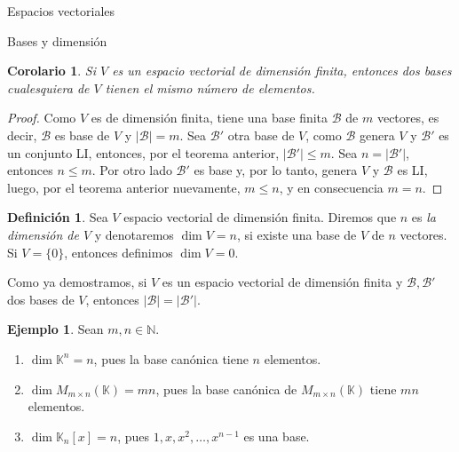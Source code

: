 \documentclass[a4paper,12pt,twoside,spanish,reqno]{amsbook}
\newtheorem{corolario}[teorema]{Corolario}
\theoremstyle{definition}
\newtheorem{definicion}{Definici\'on}[section]
\newtheorem{ejemplo}{Ejemplo}[section]
\theoremstyle{remark}
\newcommand{\K}{\mathbb K}
\begin{document}
\begin{chapter}{Espacios vectoriales}
\begin{section}{Bases y dimensión}
\begin{corolario}
	Si $V$ es un espacio vectorial de dimensión finita, entonces dos bases cualesquiera de $V$ tienen el mismo número de elementos.
\end{corolario}
\begin{proof}
		Como $V$ es de dimensión finita, tiene una base finita $\mathcal B$  de $m$ vectores, es decir,  $\mathcal B$ es base de $V$ y  $|\mathcal B| = m.$
		Sea $\mathcal B'$  otra base de $V$, como $\mathcal B$  genera $V$ y  $\mathcal B'$ es  un conjunto LI, entonces, por el teorema anterior, $|\mathcal B'| \le m$. Sea $n = |\mathcal B'|$,  entonces $n \le m$. Por otro lado $\mathcal B'$ es base y, por lo tanto,  genera $V$ y  $\mathcal B$ es LI, luego, por el teorema anterior nuevamente,  $m \le n$, y en consecuencia $m=n$.
\end{proof}

\begin{definicion}
	Sea $V$ espacio vectorial de dimensión finita. Diremos que $n$  es \textit{la dimensión de $V$} y  denotaremos $\dim V =n$,  si existe una base de $V$  de $n$  vectores. Si $V = \{0\}$,  entonces definimos $\dim V =0$.
\end{definicion}


Como ya demostramos, si $V$  es un espacio vectorial de dimensión finita y $\mathcal B,\mathcal B' $ dos bases de $V$,  entonces $|\mathcal B|=|\mathcal B'|$.



\begin{ejemplo} Sean $m,n \in \mathbb N$. 
	\begin{enumerate}
		\item $\dim \K^n= n$, pues  la base canónica tiene $n$ elementos.
		\item $\dim M_{m \times n}(\K) = mn$, pues la base canónica de $M_{m \times n}(\K)$ tiene $mn$  elementos.  
		\item $\dim \K_n[x] =n$, pues $1,x,x^2,\ldots,x^{n-1}$ es una base.   
	\end{enumerate}
\end{ejemplo}
		

\end{section}
\end{chapter}
\end{document}
